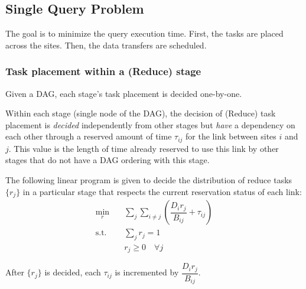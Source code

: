 \subsection{Single Query Problem}

The goal is to minimize the query execution time.
First, the tasks are placed across the sites.
Then, the data transfers are scheduled.

\subsubsection{Task placement within a (Reduce) stage}

Given a DAG, each stage's task placement is decided one-by-one.

Within each stage (single node of the DAG), the decision of (Reduce) task placement is \emph{decided} independently from other stages but \emph{have} a dependency on each other through a reserved amount of time $\tau_{ij}$ for the link between sites $i$ and $j$.
This value is the length of time already reserved to use this link by other stages that do not have a DAG ordering with this stage.

The following linear program is given to decide the distribution of reduce tasks $\{r_j\}$ in a particular stage that respects the current reservation status of each link:
\begin{subequations}
	\begin{align}
		\min_r \quad & \sum_{j}\sum_{i\neq j}\left(\dfrac{D_ir_j}{B_{ij}}+\tau_{ij}\right) \\
		\text{s.t.} \quad & \sum_jr_j=1 \\
		& r_j \geq 0 \quad\forall j
	\end{align}
\end{subequations}

After $\{r_j\}$ is decided, each $\tau_{ij}$ is incremented by $\dfrac{D_ir_j}{B_{ij}}$.


